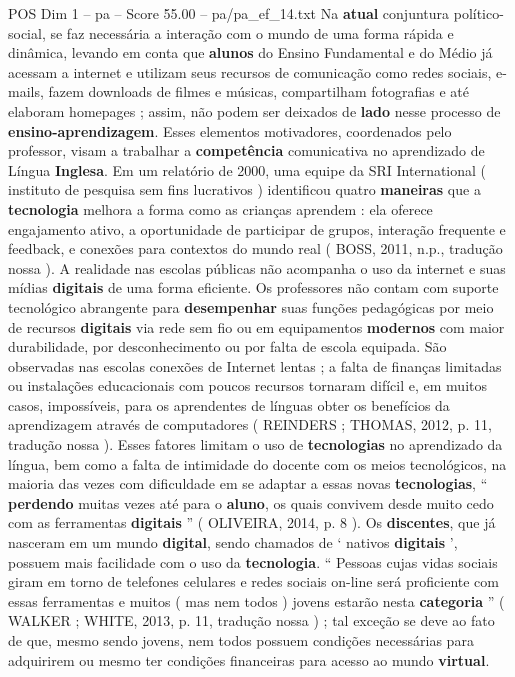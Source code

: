 \begin{textsample}{POS Dim 1 – pa – Score 55.00 – pa/pa\_ef\_14.txt}
Na \textbf{atual} conjuntura político-social, se faz necessária a interação com o mundo de uma forma rápida e dinâmica, levando em conta que \textbf{alunos} do Ensino Fundamental e do Médio já acessam a internet e utilizam seus recursos de comunicação como redes sociais, e-mails, fazem downloads de filmes e músicas, compartilham fotografias e até elaboram homepages ; assim, não podem ser deixados de \textbf{lado} nesse processo de \textbf{ensino-aprendizagem}.
Esses elementos motivadores, coordenados pelo professor, visam a trabalhar a \textbf{competência} comunicativa no aprendizado de Língua \textbf{Inglesa}.
Em um relatório de 2000, uma equipe da SRI International ( instituto de pesquisa sem fins lucrativos ) identificou quatro \textbf{maneiras} que a \textbf{tecnologia} melhora a forma como as crianças aprendem : ela oferece engajamento ativo, a oportunidade de participar de grupos, interação frequente e feedback, e conexões para contextos do mundo real ( BOSS, 2011, n.p., tradução nossa ).
A realidade nas escolas públicas não acompanha o uso da internet e suas mídias \textbf{digitais} de uma forma eficiente.
Os professores não contam com suporte tecnológico abrangente para \textbf{desempenhar} suas funções pedagógicas por meio de recursos \textbf{digitais} via rede sem fio ou em equipamentos \textbf{modernos} com maior durabilidade, por desconhecimento ou por falta de escola equipada.
São observadas nas escolas conexões de Internet lentas ; a falta de finanças limitadas ou instalações educacionais com poucos recursos tornaram difícil e, em muitos casos, impossíveis, para os aprendentes de línguas obter os benefícios da aprendizagem através de computadores ( REINDERS ; THOMAS, 2012, p. 11, tradução nossa ).
Esses fatores limitam o uso de \textbf{tecnologias} no aprendizado da língua, bem como a falta de intimidade do docente com os meios tecnológicos, na maioria das vezes com dificuldade em se adaptar a essas novas \textbf{tecnologias}, “ \textbf{perdendo} muitas vezes até para o \textbf{aluno}, os quais convivem desde muito cedo com as ferramentas \textbf{digitais} ” ( OLIVEIRA, 2014, p. 8 ).
Os \textbf{discentes}, que já nasceram em um mundo \textbf{digital}, sendo chamados de ‘ nativos \textbf{digitais} ’, possuem mais facilidade com o uso da \textbf{tecnologia}. “ Pessoas cujas vidas sociais giram em torno de telefones celulares e redes sociais on-line será proficiente com essas ferramentas e muitos ( mas nem todos ) jovens estarão nesta \textbf{categoria} ” ( WALKER ; WHITE, 2013, p. 11, tradução nossa ) ; tal exceção se deve ao fato de que, mesmo sendo jovens, nem todos possuem condições necessárias para adquirirem ou mesmo ter condições financeiras para acesso ao mundo \textbf{virtual}.

\end{textsample}
